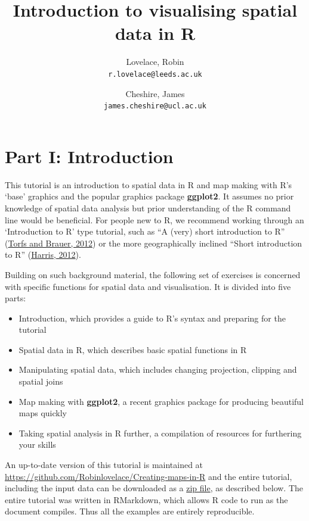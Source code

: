 \documentclass[]{article}
\author{}
\author{Lovelace, Robin\\
\texttt{r.lovelace@leeds.ac.uk}
\and
Cheshire, James\\
\texttt{james.cheshire@ucl.ac.uk}
}
\title{Introduction to visualising spatial data in R}
\begin{document}
\maketitle
\tableofcontents
\section{Part I: Introduction}\label{part-i-introduction}

This tutorial is an introduction to spatial data in R and map making
with R's `base' graphics and the popular graphics package
\textbf{ggplot2}. It assumes no prior knowledge of spatial data analysis
but prior understanding of the R command line would be beneficial. For
people new to R, we recommend working through an `Introduction to R'
type tutorial, such as ``A (very) short introduction to R''
(\href{http://cran.r-project.org/doc/contrib/Torfs+Brauer-Short-R-Intro.pdf}{Torfs
and Brauer, 2012}) or the more geographically inclined ``Short
introduction to R''
(\href{http://www.social-statistics.org/wp-content/uploads/2012/12/intro_to_R1.pdf}{Harris,
2012}).

Building on such background material, the following set of exercises is
concerned with specific functions for spatial data and visualisation. It
is divided into five parts:

\begin{itemize}
\itemsep1pt\parskip0pt
\item
  Introduction, which provides a guide to R's syntax and preparing for
  the tutorial
\item
  Spatial data in R, which describes basic spatial functions in R
\item
  Manipulating spatial data, which includes changing projection,
  clipping and spatial joins
\item
  Map making with \textbf{ggplot2}, a recent graphics package for
  producing beautiful maps quickly
\item
  Taking spatial analysis in R further, a compilation of resources for
  furthering your skills
\end{itemize}

An up-to-date version of this tutorial is maintained at
\href{https://github.com/Robinlovelace/Creating-maps-in-R/blob/master/intro-spatial-rl.pdf}{https://github.com/Robinlovelace/Creating-maps-in-R}
and the entire tutorial, including the input data can be downloaded as a
\href{https://github.com/Robinlovelace/Creating-maps-in-R/archive/master.zip}{zip
file}, as described below. The entire tutorial was written in RMarkdown,
which allows R code to run as the document compiles. Thus all the
examples are entirely reproducible.
\end{document}
